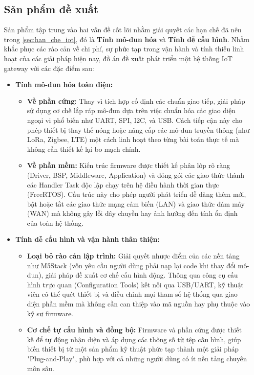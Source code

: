    \subsection{Sản phẩm đề xuất}
        Sản phẩm tập trung vào hai vấn đề cốt lõi nhằm giải quyết các hạn chế đã nêu trong \autoref{sec:han_che_iot}, đó là \textbf{Tính mô-đun hóa} và \textbf{Tính dễ cấu hình}.
        Nhằm khắc phục các rào cản về chi phí, sự phức tạp trong vận hành và tính thiếu linh hoạt của các giải pháp hiện nay, đồ án đề xuất phát triển một hệ thống IoT gateway với các đặc điểm sau:
        \begin{itemize}
            \item \textbf{Tính mô-đun hóa toàn diện:}
            \begin{itemize}
                \item \textbf{Về phần cứng:} Thay vì tích hợp cố định các chuẩn giao tiếp, giải pháp sử dụng cơ chế lắp ráp mô-đun dựa trên việc chuẩn hóa các giao diện ngoại vi phổ biến như UART, SPI, I2C, và USB. Cách tiếp cận này cho phép thiết bị thay thế nóng hoặc nâng cấp các mô-đun truyền thông (như LoRa, Zigbee, LTE) một cách linh hoạt theo từng bài toán thực tế mà không cần thiết kế lại bo mạch chính.
                \item \textbf{Về phần mềm:} Kiến trúc firmware được thiết kế phân lớp rõ ràng (Driver, BSP, Middleware, Application) và đóng gói các giao thức thành các Handler Task độc lập chạy trên hệ điều hành thời gian thực (FreeRTOS). Cấu trúc này cho phép người phát triển dễ dàng thêm mới, bật hoặc tắt các giao thức mạng cảm biến (LAN) và giao thức đám mây (WAN) mà không gây lỗi dây chuyền hay ảnh hưởng đến tính ổn định của toàn hệ thống.
            \end{itemize}
            \item \textbf{Tính dễ cấu hình và vận hành thân thiện:}
            \begin{itemize}
                \item \textbf{Loại bỏ rào cản lập trình:} Giải quyết nhược điểm của các nền tảng như M5Stack (vốn yêu cầu người dùng phải nạp lại code khi thay đổi mô-đun), giải pháp đề xuất cơ chế cấu hình động. Thông qua công cụ cấu hình trực quan (Configuration Tools) kết nối qua USB/UART, kỹ thuật viên có thể quét thiết bị và điều chỉnh mọi tham số hệ thống qua giao diện phần mềm mà không cần can thiệp vào mã nguồn hay phụ thuộc vào kỹ sư firmware.
                \item \textbf{Cơ chế tự cấu hình và đồng bộ:} Firmware và phần cứng được thiết kế để tự động nhận diện và áp dụng các thông số từ tệp cấu hình, giúp biến thiết bị từ một sản phẩm kỹ thuật phức tạp thành một giải pháp "Plug-and-Play", phù hợp với cả những người dùng có ít nền tảng chuyên môn sâu.

\end{itemize}
\end{itemize}
